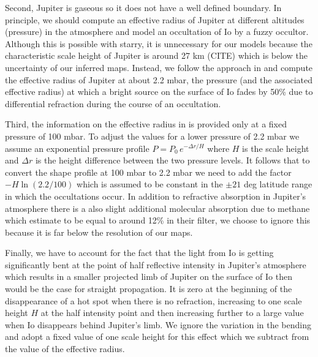 \documentclass[modern]{aastex62}
\begin{document}
Second, Jupiter is gaseous so it does not have a well defined boundary.
In principle, we should compute an effective radius of Jupiter at different altitudes (pressure) in the atmosphere and model an occultation of Io by a fuzzy occultor.
Although this is possible with \textsf{starry}, it is unnecessary for our models because the characteristic scale height of Jupiter is around 27 km (CITE) which is below the uncertainty of our inferred maps.
Instead, we follow the approach in \cite{spencer1990} and compute the effective radius of Jupiter at about 2.2 mbar, the pressure (and the associated effective radius) at which a  bright source on the surface of Io fades by 50\% due to differential refraction during the course of an occultation.

Third, the information on the effective radius in \cite{lindal1981} is provided only at a fixed pressure of 100 mbar.
To adjust the values for a lower pressure of 2.2 mbar we assume an exponential pressure profile $P=P_0\, e^{-\Delta r/H}$ where $H$ is the scale height and $\Delta r$ is the height difference between the two pressure levels.
It follows that to convert the shape profile at 100 mbar to 2.2 mbar we need to add the factor
$-H\ln(2.2/100)$ which is assumed to be constant in the $\pm 21$ deg latitude range in which the occultations occur.
In addition to refractive absorption in Jupiter's atmosphere there is a also slight additional molecular absorption due to methane which \cite{spencer1990} estimate to be equal to around 12\% in their filter, we choose to ignore this because it is far below the resolution of our maps.

Finally, we have to account for the fact that the light from Io is getting significantly bent at the point of half reflective intensity in Jupiter's atmosphere which results in a smaller projected limb of Jupiter on the surface of Io then would be the case for straight propagation.
It is zero at the beginning of the disappearance of a hot spot when there is no refraction, increasing to one scale height $H$ at the half intensity point and then increasing further to a large value when Io disappears behind Jupiter's limb.
We ignore the variation in the bending and adopt a fixed value of one scale height for this effect which we subtract from the value of the effective radius.
\end{document}
